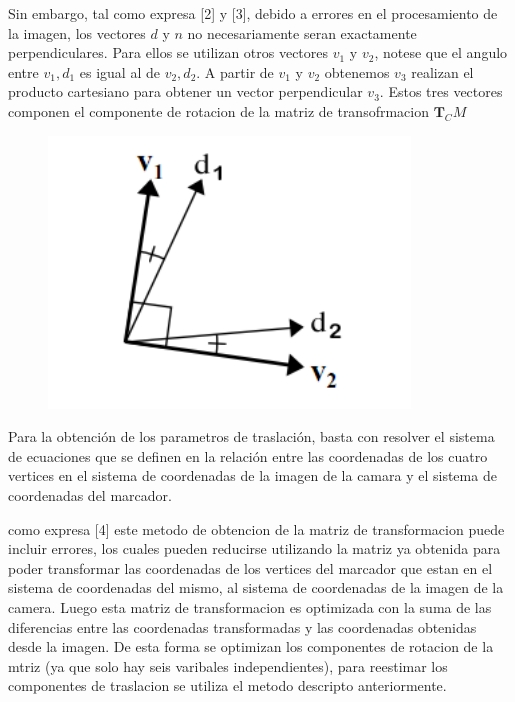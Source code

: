 \documentclass[runningheads]{llncs}
\begin{document}
	Sin embargo, tal como expresa [2] y [3], debido a errores en el procesamiento de la imagen, los vectores $d$ y $n$ no necesariamente seran exactamente perpendiculares. Para ellos se utilizan otros vectores $v_1$ y $ v_2 $, notese que el angulo entre $ v_1, d_1 $ es igual al de $v_2,d_2$. A partir de $v_1$ y $ v_2 $ obtenemos $ v_3 $ realizan el producto cartesiano para obtener un vector perpendicular $v_3$. Estos tres vectores componen el componente de rotacion de la matriz de transofrmacion $\textbf{T}_CM$
	
	\begin{figure}
		\centering
		\includegraphics[width=0.7\linewidth]{Imagenes/ar-d1d2}
		\caption{}
		\label{fig:ar-d1d2}
	\end{figure}
	
	Para la obtención de los parametros de traslación, basta con resolver el sistema de ecuaciones que se definen en la relación entre las coordenadas de los cuatro vertices en el sistema de coordenadas de la imagen de la camara y el sistema de coordenadas del marcador.
	
	como expresa [4] este metodo de obtencion de la matriz de transformacion puede incluir errores, los cuales pueden reducirse utilizando la matriz ya obtenida para poder transformar las coordenadas de los vertices del marcador que estan en el sistema de coordenadas del mismo, al sistema de coordenadas de la imagen de la camera. Luego esta matriz de transformacion es optimizada  con la suma de las diferencias entre las coordenadas transformadas y las coordenadas obtenidas desde la imagen. De esta forma se optimizan los componentes de rotacion de la mtriz (ya que solo hay seis varibales independientes), para reestimar los componentes de traslacion se utiliza el metodo descripto anteriormente. 
	
	
	
\end{document}

